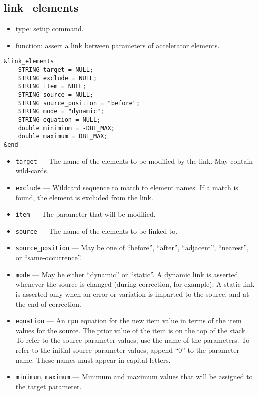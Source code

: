 \documentclass[11pt]{article}
\begin{document}
\subsection{link\_elements \label{subsec:linkelements}}

\begin{itemize}
\item type: setup command.
\item function: assert a link between parameters of accelerator elements.
\end{itemize}

\begin{verbatim}
&link_elements
    STRING target = NULL;
    STRING exclude = NULL;
    STRING item = NULL;
    STRING source = NULL;
    STRING source_position = "before";
    STRING mode = "dynamic";
    STRING equation = NULL;
    double minimium = -DBL_MAX;
    double maximum = DBL_MAX;
&end
\end{verbatim}

\begin{itemize}
\item \verb|target| --- The name of the elements to be modified by the link.  May contain
 wild-cards.
\item \verb|exclude| --- Wildcard sequence to match to element names.  If a match is found,
 the element is excluded from the link.
\item \verb|item| --- The parameter that will be modified.
\item \verb|source| --- The name of the elements to be linked to.
\item \verb|source_position| --- May be one of ``before'', ``after'', 
``adjacent'', ``nearest'', or ``same-occurrence''.
\item \verb|mode| --- May be either ``dynamic'' or ``static''.  A dynamic link
is asserted whenever the source is changed (during correction, for example).  
A static link is asserted only when an error or variation is imparted to
the source, and at the end of correction.
\item \verb|equation| --- An {\tt rpn} equation for the new item value in
terms of the item values for the source.  The prior value of the item is 
on the top of the stack. To refer to the source
parameter values, use the name of the parameters. To refer to the initial source
parameter values, append ``0'' to the parameter name.  These names must appear
in capital letters.  
\item \verb|minimum|, \verb|maximum| --- Minimum and maximum values that will be
assigned to the target parameter.
\end{itemize}
\end{document}
